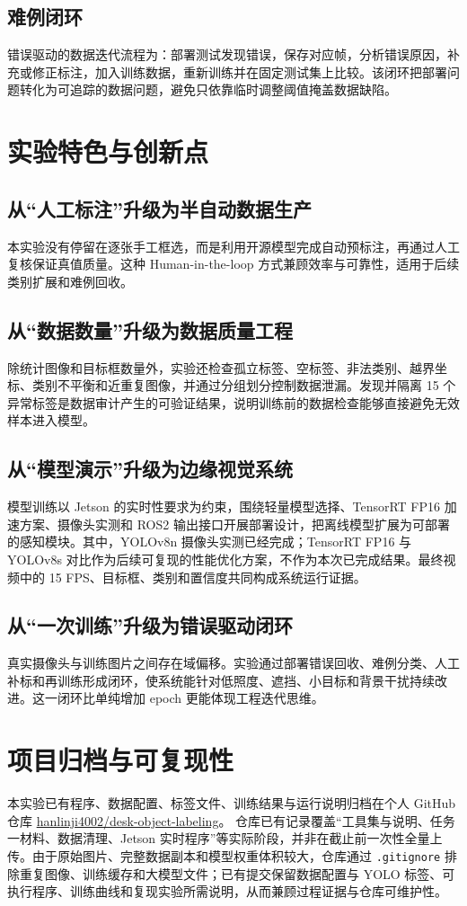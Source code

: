 \documentclass[UTF8,fontset=none,a4paper,11pt]{ctexart}
\begin{document}
\subsection{难例闭环}
错误驱动的数据迭代流程为：部署测试发现错误，保存对应帧，分析错误原因，补充或修正标注，加入训练数据，重新训练并在固定测试集上比较。该闭环把部署问题转化为可追踪的数据问题，避免只依靠临时调整阈值掩盖数据缺陷。

\section{实验特色与创新点}
\subsection{从“人工标注”升级为半自动数据生产}
本实验没有停留在逐张手工框选，而是利用开源模型完成自动预标注，再通过人工复核保证真值质量。这种 Human-in-the-loop 方式兼顾效率与可靠性，适用于后续类别扩展和难例回收。

\subsection{从“数据数量”升级为数据质量工程}
除统计图像和目标框数量外，实验还检查孤立标签、空标签、非法类别、越界坐标、类别不平衡和近重复图像，并通过分组划分控制数据泄漏。发现并隔离 15 个异常标签是数据审计产生的可验证结果，说明训练前的数据检查能够直接避免无效样本进入模型。

\subsection{从“模型演示”升级为边缘视觉系统}
模型训练以 Jetson 的实时性要求为约束，围绕轻量模型选择、TensorRT FP16 加速方案、摄像头实测和 ROS2 输出接口开展部署设计，把离线模型扩展为可部署的感知模块。其中，YOLOv8n 摄像头实测已经完成；TensorRT FP16 与 YOLOv8s 对比作为后续可复现的性能优化方案，不作为本次已完成结果。最终视频中的 15 FPS、目标框、类别和置信度共同构成系统运行证据。

\subsection{从“一次训练”升级为错误驱动闭环}
真实摄像头与训练图片之间存在域偏移。实验通过部署错误回收、难例分类、人工补标和再训练形成闭环，使系统能针对低照度、遮挡、小目标和背景干扰持续改进。这一闭环比单纯增加 epoch 更能体现工程迭代思维。

\section{项目归档与可复现性}
本实验已有程序、数据配置、标签文件、训练结果与运行说明归档在个人 GitHub 仓库
\href{https://github.com/hanlinji4002/desk-object-labeling}{hanlinji4002/desk-object-labeling}。
仓库已有记录覆盖“工具集与说明、任务一材料、数据清理、Jetson 实时程序”等实际阶段，并非在截止前一次性全量上传。由于原始图片、完整数据副本和模型权重体积较大，仓库通过 \texttt{.gitignore} 排除重复图像、训练缓存和大模型文件；已有提交保留数据配置与 YOLO 标签、可执行程序、训练曲线和复现实验所需说明，从而兼顾过程证据与仓库可维护性。
\end{document}
